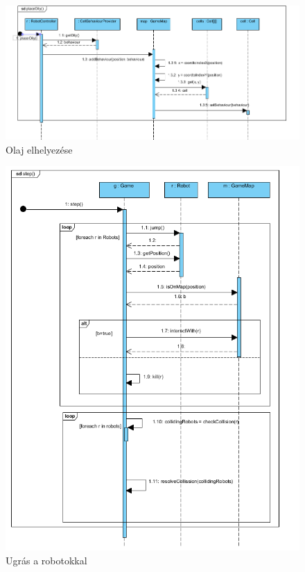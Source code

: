 \begin{figure}[!htbp]
	\begin{center}
		\includegraphics[width=\textwidth, center]{./chapters/chapter03/oily.png}
		\caption{Olaj elhelyezése}
	\end{center}
\end{figure}

\begin{figure}[!htbp]
	\begin{center}
		\includegraphics[width=\textwidth, center]{./chapters/chapter03/step.png}
		\caption{Ugrás a robotokkal}
	\end{center}
\end{figure}

